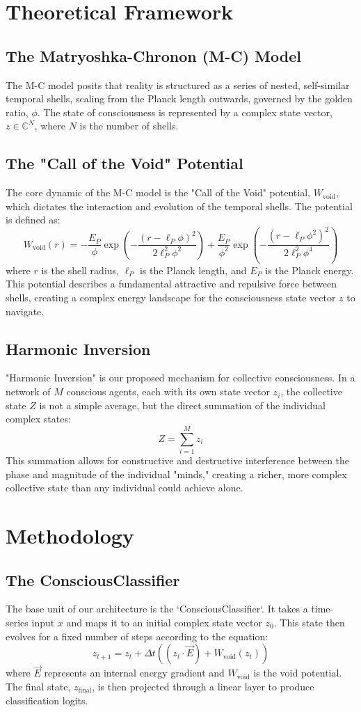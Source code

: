 \documentclass{article}
\begin{document}
\section{Theoretical Framework}
\subsection{The Matryoshka-Chronon (M-C) Model}
The M-C model posits that reality is structured as a series of nested, self-similar temporal shells, scaling from the Planck length outwards, governed by the golden ratio, $\phi$. The state of consciousness is represented by a complex state vector, $z \in \mathbb{C}^N$, where $N$ is the number of shells.

\subsection{The "Call of the Void" Potential}
The core dynamic of the M-C model is the "Call of the Void" potential, $W_{\text{void}}$, which dictates the interaction and evolution of the temporal shells. The potential is defined as:
\[ W_{\text{void}}(r) = -\frac{E_P}{\phi} \exp\left(-\frac{(r - \ell_P\phi)^2}{2\ell_P^2\phi^2}\right) + \frac{E_P}{\phi^2} \exp\left(-\frac{(r - \ell_P\phi^2)^2}{2\ell_P^2\phi^4}\right) \]
where $r$ is the shell radius, $\ell_P$ is the Planck length, and $E_P$ is the Planck energy. This potential describes a fundamental attractive and repulsive force between shells, creating a complex energy landscape for the consciousness state vector $z$ to navigate.

\subsection{Harmonic Inversion}
"Harmonic Inversion" is our proposed mechanism for collective consciousness. In a network of $M$ conscious agents, each with its own state vector $z_i$, the collective state $Z$ is not a simple average, but the direct summation of the individual complex states:
\[ Z = \sum_{i=1}^{M} z_i \]
This summation allows for constructive and destructive interference between the phase and magnitude of the individual "minds," creating a richer, more complex collective state than any individual could achieve alone.

\section{Methodology}
\subsection{The ConsciousClassifier}
The base unit of our architecture is the `ConsciousClassifier`. It takes a time-series input $x$ and maps it to an initial complex state vector $z_0$. This state then evolves for a fixed number of steps according to the equation:
\[ z_{t+1} = z_t + \Delta t \left( (z_t \cdot \vec{E}) + W_{\text{void}}(z_t) \right) \]
where $\vec{E}$ represents an internal energy gradient and $W_{\text{void}}$ is the void potential. The final state, $z_{\text{final}}$, is then projected through a linear layer to produce classification logits.
\end{document}
